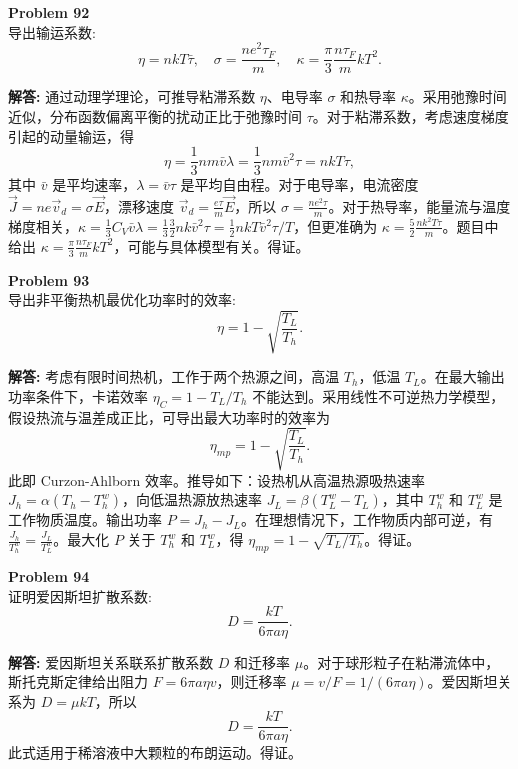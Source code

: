 \documentclass[12pt, a4paper, oneside]{ctexart}
\newenvironment{solution}{\par\noindent\textbf{解答:}\quad}{\par}
\begin{document}
\begin{mdframed}[backgroundcolor=gray!10, linewidth=0pt]
    \textbf{Problem 92} \\
    导出输运系数:
    \[
    \eta = n k T \bar{\tau}, \quad \sigma = \frac{n e^2 \tau_F}{m}, \quad \kappa = \frac{\pi}{3} \frac{n \tau_F}{m} k T^2.
    \]
\end{mdframed}
\begin{solution}
    通过动理学理论，可推导粘滞系数 $\eta$、电导率 $\sigma$ 和热导率 $\kappa$。采用弛豫时间近似，分布函数偏离平衡的扰动正比于弛豫时间 $\tau$。对于粘滞系数，考虑速度梯度引起的动量输运，得
    \[
    \eta = \frac{1}{3} n m \bar{v} \lambda = \frac{1}{3} n m \bar{v}^2 \tau = n k T \tau,
    \]
    其中 $\bar{v}$ 是平均速率，$\lambda = \bar{v} \tau$ 是平均自由程。对于电导率，电流密度 $\vec{J} = n e \vec{v}_d = \sigma \vec{E}$，漂移速度 $\vec{v}_d = \frac{e \tau}{m} \vec{E}$，所以 $\sigma = \frac{n e^2 \tau}{m}$。对于热导率，能量流与温度梯度相关，$\kappa = \frac{1}{3} C_V \bar{v} \lambda = \frac{1}{3} \frac{3}{2} n k \bar{v}^2 \tau = \frac{1}{2} n k T \bar{v}^2 \tau / T$，但更准确为 $\kappa = \frac{5}{2} \frac{n k^2 T \tau}{m}$。题目中给出 $\kappa = \frac{\pi}{3} \frac{n \tau_F}{m} k T^2$，可能与具体模型有关。得证。
\end{solution}

\begin{mdframed}[backgroundcolor=gray!10, linewidth=0pt]
    \textbf{Problem 93} \\
    导出非平衡热机最优化功率时的效率:
    \[
    \eta = 1 - \sqrt{\frac{T_L}{T_h}}.
    \]
\end{mdframed}
\begin{solution}
    考虑有限时间热机，工作于两个热源之间，高温 $T_h$，低温 $T_L$。在最大输出功率条件下，卡诺效率 $\eta_C = 1 - T_L/T_h$ 不能达到。采用线性不可逆热力学模型，假设热流与温差成正比，可导出最大功率时的效率为
    \[
    \eta_{mp} = 1 - \sqrt{\frac{T_L}{T_h}}.
    \]
    此即 Curzon-Ahlborn 效率。推导如下：设热机从高温热源吸热速率 $J_h = \alpha (T_h - T_h^w)$，向低温热源放热速率 $J_L = \beta (T_L^w - T_L)$，其中 $T_h^w$ 和 $T_L^w$ 是工作物质温度。输出功率 $P = J_h - J_L$。在理想情况下，工作物质内部可逆，有 $\frac{J_h}{T_h^w} = \frac{J_L}{T_L^w}$。最大化 $P$ 关于 $T_h^w$ 和 $T_L^w$，得 $\eta_{mp} = 1 - \sqrt{T_L/T_h}$。得证。
\end{solution}

\begin{mdframed}[backgroundcolor=gray!10, linewidth=0pt]
    \textbf{Problem 94} \\
    证明爱因斯坦扩散系数:
    \[
    D = \frac{kT}{6\pi a \eta}.
    \]
\end{mdframed}
\begin{solution}
    爱因斯坦关系联系扩散系数 $D$ 和迁移率 $\mu$。对于球形粒子在粘滞流体中，斯托克斯定律给出阻力 $F = 6\pi a \eta v$，则迁移率 $\mu = v/F = 1/(6\pi a \eta)$。爱因斯坦关系为 $D = \mu k T$，所以
    \[
    D = \frac{kT}{6\pi a \eta}.
    \]
    此式适用于稀溶液中大颗粒的布朗运动。得证。
\end{solution}
\newpage
\end{document}
